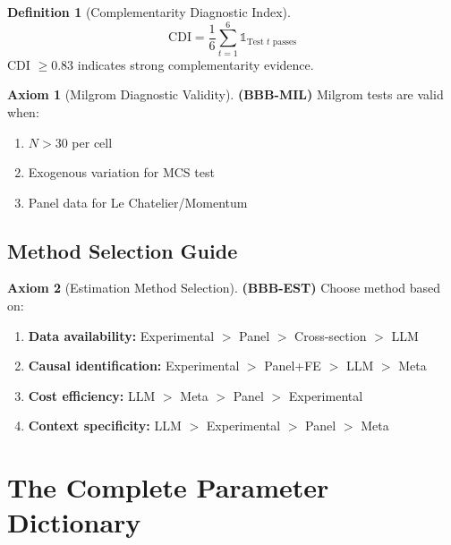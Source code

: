 \documentclass[11pt,a4paper]{article}
\theoremstyle{definition}
\newtheorem{definition}{Definition}[section]
\newtheorem{axiom}{Axiom}[section]
\begin{document}
\begin{definition}[Complementarity Diagnostic Index]
\begin{equation}
\text{CDI} = \frac{1}{6} \sum_{t=1}^{6} \mathbb{1}_{\text{Test } t \text{ passes}}
\end{equation}
CDI $\geq 0.83$ indicates strong complementarity evidence.
\end{definition}

\begin{axiom}[Milgrom Diagnostic Validity]
\label{ax:bbb-mil}
\textbf{(BBB-MIL)} Milgrom tests are valid when:
\begin{enumerate}
    \item $N > 30$ per cell
    \item Exogenous variation for MCS test
    \item Panel data for Le Chatelier/Momentum
\end{enumerate}
\end{axiom}

\subsection{Method Selection Guide}

\begin{axiom}[Estimation Method Selection]
\label{ax:bbb-est}
\textbf{(BBB-EST)} Choose method based on:
\begin{enumerate}
    \item \textbf{Data availability:} Experimental $>$ Panel $>$ Cross-section $>$ LLM
    \item \textbf{Causal identification:} Experimental $>$ Panel+FE $>$ LLM $>$ Meta
    \item \textbf{Cost efficiency:} LLM $>$ Meta $>$ Panel $>$ Experimental
    \item \textbf{Context specificity:} LLM $>$ Experimental $>$ Panel $>$ Meta
\end{enumerate}
\end{axiom}


\section{The Complete Parameter Dictionary}
\label{sec:bbb-dictionary}
\end{document}

